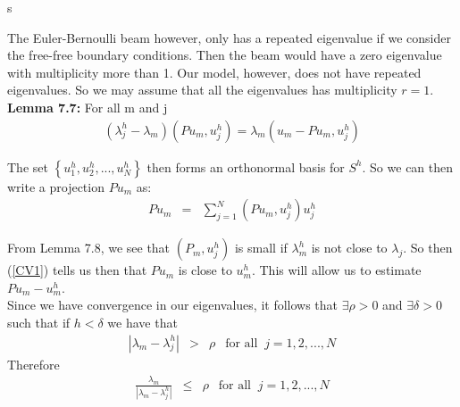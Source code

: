 s\documentclass[../../main.tex]{subfiles}
\begin{document}
The Euler-Bernoulli beam however, only has a repeated eigenvalue if we consider the free-free boundary conditions. Then the beam would have a zero eigenvalue with multiplicity more than 1. Our model, however, does not have repeated eigenvalues. So we may assume that all the eigenvalues has multiplicity $r=1$.\\


\textbf{Lemma 7.7:} For all m and j
\begin{eqnarray*}
(\lambda_{j}^{h} - \lambda_{m}) ( Pu_{m}, u_{j}^{h}) = \lambda_{m} ( u_{m}-Pu_{m},u_{j}^{h} )
\end{eqnarray*}

\begin{comment}
\textbf{Proof:}
Since the term $\lambda_{m}( Pu,u^{h}_{j})$ appears on both sides of the equation, it is only required to show that
\begin{eqnarray*}
\lambda_{j}^{h}( Pu, u_{j}^{h} ) &=& \lambda_{m} ( u, u_{j}^{h} )
\end{eqnarray*}
Now
\begin{eqnarray*}
\lambda_{j}^{h}( Pu, u_{j}^{h} ) &=& b(Pu,u_{j}^{h})\\
\lambda_{m} ( u, u_{j}^{h} ) &=& b(u,u_{j}^{h})
\end{eqnarray*} Since $u$ and $u_{j}^{h}$ are both eigenfunctions.\\


Then equality follows from the definitions of the projection P.
\qed
\end{comment}

The set $\left\{u_{1}^{h},u_{2}^{h},...,u_{N}^{h}\right\}$ then forms an orthonormal basis for $S^{h}$. So we can then write a projection $Pu_{m}$ as:
\begin{eqnarray}
Pu_{m} &=& \sum_{j=1}^{N} ( P u_{m} ,u_{j}^{h}) u_{j}^{h} \label{CV1}
\end{eqnarray}


From Lemma 7.8, we see that $( P_{m},u_{j}^{h} )$ is small if $\lambda_{m}^{h}$ is not close to $\lambda_{j}$. So then (\ref{CV1}) tells us then that $Pu_{m}$ is close to $u_{m}^{h}$. This will allow us to estimate $Pu_{m} - u_{m}^{h}$.\\


Since we have convergence in our eigenvalues, it follows that $\exists \rho > 0$ and $\exists \delta > 0$ such that if $h<\delta$ we have that
\begin{eqnarray}
|\lambda_{m} - \lambda_{j}^{h}| &>& \rho \ \ \textrm{ for all } \ j = 1,2,...,N
\end{eqnarray}
Therefore
\begin{eqnarray}
\frac{\lambda_{m}}{|\lambda_{m} - \lambda_{j}^{h}|} &\leq & \rho \ \ \textrm{ for all } \ j = 1,2,...,N
\end{eqnarray}
\end{document}
